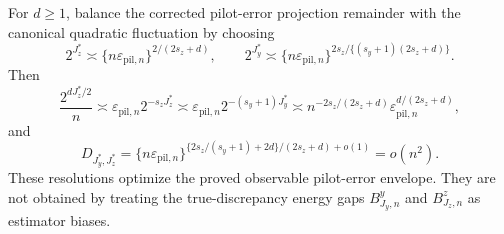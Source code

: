 For \(d\ge1\), balance the corrected pilot-error projection remainder with the canonical quadratic fluctuation by choosing
\[
2^{J_z^*}\asymp\{n\varepsilon_{\mathrm{pil},n}\}^{2/(2s_z+d)},
\qquad
2^{J_y^*}\asymp
\{n\varepsilon_{\mathrm{pil},n}\}^{2s_z/\{(s_y+1)(2s_z+d)\}}.
\]
Then
\[
\frac{2^{dJ_z^*/2}}n
\asymp
\varepsilon_{\mathrm{pil},n}2^{-s_zJ_z^*}
\asymp
\varepsilon_{\mathrm{pil},n}2^{-(s_y+1)J_y^*}
\asymp
n^{-2s_z/(2s_z+d)}
\varepsilon_{\mathrm{pil},n}^{d/(2s_z+d)},
\]
and
\[
D_{J_y^*,J_z^*}
=\{n\varepsilon_{\mathrm{pil},n}\}^{\{2s_z/(s_y+1)+2d\}/(2s_z+d)+o(1)}
=o(n^2).
\]
These resolutions optimize the proved observable pilot-error envelope.  They are not obtained by treating the true-discrepancy energy gaps \(B^y_{J_y,n}\) and \(B^z_{J_z,n}\) as estimator biases.